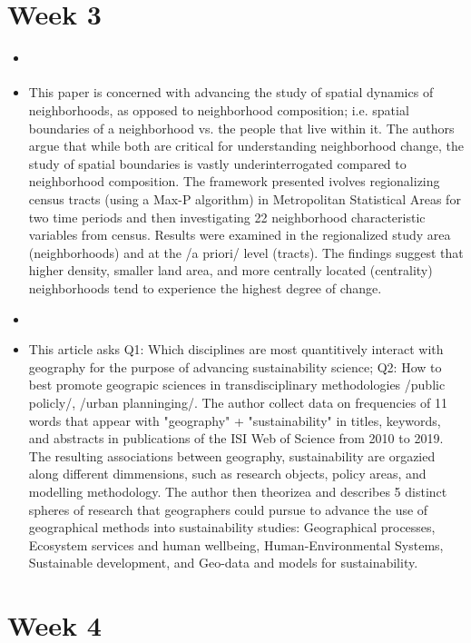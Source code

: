 \documentclass{article} \usepackage{filecontents}
\begin{document}
\section{Week 3}
\begin{itemize}

\item \cite{rey2011MeasuringSpatial}
\item This paper is concerned with advancing the study of spatial
  dynamics of neighborhoods, as opposed to neighborhood composition;
  i.e. spatial boundaries of a neighborhood vs. the people that live
  within it. The authors argue that while both are critical for
  understanding neighborhood change, the study of spatial boundaries
  is vastly underinterrogated compared to neighborhood
  composition. The framework presented ivolves regionalizing census
  tracts (using a Max-P algorithm) in Metropolitan Statistical Areas
  for two time periods and then investigating 22 neighborhood
  characteristic variables from census. Results were examined in the
  regionalized study area (neighborhoods) and at the /a priori/ level
  (tracts). The findings suggest that higher density, smaller land
  area, and more centrally located (centrality) neighborhoods tend to
  experience the highest degree of change.

\item \cite{fu2020PromotingGeography}
\item This article asks Q1: Which disciplines are most quantitively
  interact with geography for the purpose of advancing sustainability
  science; Q2: How to best promote geograpic sciences in
  transdisciplinary methodologies /public policly/, /urban
  planninging/. The author collect data on frequencies of 11 words
  that appear with "geography" + "sustainability" in titles, keywords,
  and abstracts in publications of the ISI Web of Science from 2010 to
  2019. The resulting associations between geography, sustainability
  are orgazied along different dimmensions, such as research objects,
  policy areas, and modelling methodology. The author then theorizea
  and describes 5 distinct spheres of research that geographers could
  pursue to advance the use of geographical methods into
  sustainability studies: Geographical processes, Ecosystem services
  and human wellbeing, Human-Environmental Systems, Sustainable
  development, and Geo-data and models for sustainability.

\end{itemize}
\section{Week 4}
\end{document}
